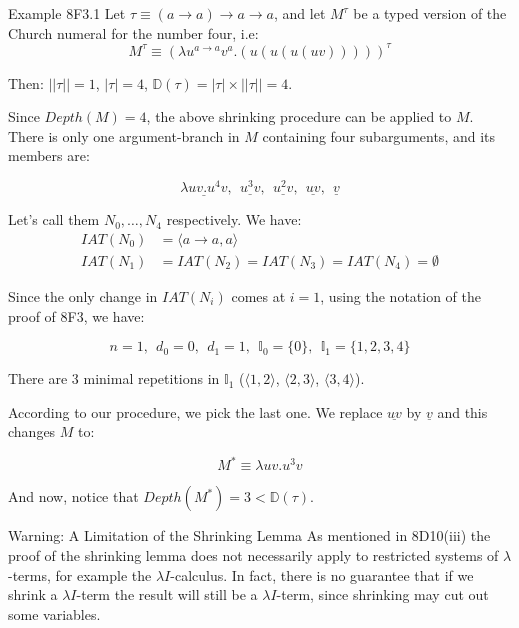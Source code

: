 \begin{frame}[allowframebreaks]{Example 8F3.1}
    Let $\tau \equiv (a \rightarrow a) \rightarrow a \rightarrow a$, and let $M^\tau$ be a typed version of the Church numeral for the number four, i.e: 
    \begin{equation*}
        M^\tau \equiv (\lambda u^{a \rightarrow a} v^a .(u(u(u(uv)))))^\tau
    \end{equation*}
    
    Then: $|| \tau || = 1$, $|\tau| = 4$, $\mathbb{D}(\tau) = |\tau| \times || \tau || = 4$.
    
    \medskip 
    
    Since $Depth(M) = 4$, the above shrinking procedure can be applied to $M$. There is only one argument-branch in $M$ containing four subarguments, and its members are: 
    
    \begin{equation*} 
    \underline{\lambda uv.u^4 v}, \ \ \underline{u^3 v}, \ \ \underline{u^2 v}, \ \ 
    \underline{uv}, \ \ \underline{v}
    \end{equation*} 
    
    \framebreak
    
    Let's call them $N_0, \ldots, N_4$ respectively. We have: 
    \begin{align*}
        IAT(N_0) &= \langle a \rightarrow a, a \rangle \\ 
        IAT(N_1) &= IAT(N_2) = IAT(N_3) = IAT(N_4) = \emptyset 
    \end{align*}
    
    Since the only change in $IAT(N_i)$ comes at $i = 1$, using the notation of the proof of 8F3, we have: 
    
    \begin{equation*}
        n = 1, \ \ d_0 = 0, \ \ d_1 = 1, \ \ \mathbb{I}_0 = \{ 0 \}, \ \ \mathbb{I}_1 = \{1, 2, 3, 4 \}
    \end{equation*}
    
    There are 3 minimal repetitions in $\mathbb{I}_1$ ($\langle 1, 2 \rangle$, $\langle 2, 3 \rangle$, $\langle 3, 4 \rangle$). 
    
    \framebreak 
    
    According to our procedure, we pick the last one. We replace $\underline{uv}$ by $\underline{v}$ and this changes $M$ to: 
    
    \begin{equation*}
        M^* \equiv \lambda u v. u^3 v
    \end{equation*}
    
    And now, notice that $Depth(M^*) = 3 < \mathbb{D}(\tau)$. 
\end{frame}

\begin{frame}{Warning: A Limitation of the Shrinking Lemma}
As mentioned in 8D10(iii) the proof of the shrinking lemma does not necessarily apply to restricted systems of $\lambda$-terms, for example the $\lambda I$-calculus. In fact, there is no guarantee that if we shrink a $\lambda I$-term the result will still be a $\lambda I$-term, since shrinking may cut out some variables.  
    
\end{frame}

